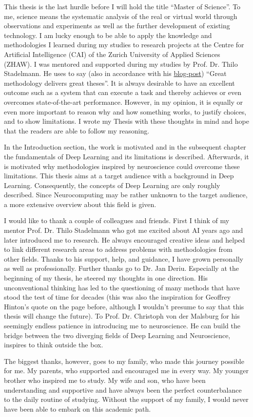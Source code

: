 \small
This thesis is the last hurdle before I will hold the title ``Master of Science''.
To me, science means the systematic analysis of the real or virtual world through observations and experiments as well as the further development of existing technology. 
I am lucky enough to be able to apply the knowledge and methodologies I learned during my studies to research projects at the Centre for Artificial Intelligence (CAI) of the Zurich University of Applied Sciences (ZHAW).
I was mentored and supported during my studies by Prof. Dr. Thilo Stadelmann.
He uses to say (also in accordance with his \href{https://stdm.github.io/Great-methodology-delivers-great-theses/}{blog-post}) ``Great methodology delivers great theses''.
It is always desirable to have an excellent outcome such as a system that can execute a task and thereby achieves or even overcomes state-of-the-art performance.
However, in my opinion, it is equally or even more important to reason why and how something works, to justify choices, and to show limitations.
I wrote my Thesis with these thoughts in mind and hope that the readers are able to follow my reasoning.

In the Introduction section, the work is motivated and in the subsequent chapter the fundamentals of Deep Learning and its limitations is described.
Afterwards, it is motivated why methodologies inspired by neuroscience could overcome these limitations.
This thesis aims at a target audience with a background in Deep Learning.
Consequently, the concepts of Deep Learning are only roughly described.
Since Neurocomputing may be rather unknown to the target audience, a more extensive overview about this field is given.

I would like to thank a couple of colleagues and friends.
First I think of my mentor Prof. Dr. Thilo Stadelmann who got me excited about AI years ago and later introduced me to research.
He always encouraged creative ideas and helped to link different research areas to address problems with methodologies from other fields.
Thanks to his support, help, and guidance, I have grown personally as well as professionally.
Further thanks go to Dr. Jan Deriu. 
Especially at the beginning of my thesis, he steered my thoughts in one direction.
His unconventional thinking has led to the questioning of many methods that have stood the test of time for decades (this was also the inspiration for Geoffrey Hinton's quote on the page before, although I wouldn't presume to say that this thesis will change the future).
To Prof. Dr. Christoph von der Malsburg for his seemingly endless patience in introducing me to neuroscience.
He can build the bridge between the two diverging fields of Deep Learning and Neuroscience, inspires to think outside the box.

The biggest thanks, however, goes to my family, who made this journey possible for me.
My parents, who supported and encouraged me in every way.
My younger brother who inspired me to study.
My wife and son, who have been understanding and supportive and have always been the perfect counterbalance to the daily routine of studying.
Without the support of my family, I would never have been able to embark on this academic path.
\normalsize
